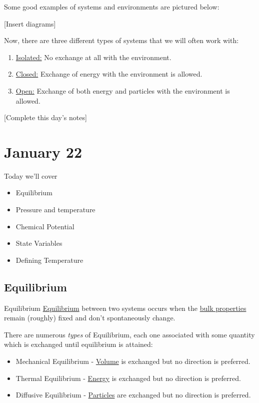 \documentclass{article}
\begin{document}
\vskip 0.5cm
Some good examples of systems and environments are pictured below: 

[Insert diagrams]

\vskip 0.5cm
Now, there are three different types of systems that we will often work with:
\begin{enumerate}
  \item \underline{Isolated:} No exchange at all with the environment.
  \item \underline{Closed:} Exchange of energy with the environment is allowed.
  \item \underline{Open:} Exchange of both energy and particles with the environment is allowed.
\end{enumerate}

[Complete this day's notes]

\pagebreak

\section{January 22}
Today we'll cover  
\begin{itemize}
  \item Equilibrium
  \item Pressure and temperature
  \item Chemical Potential
  \item State Variables
  \item Defining Temperature
\end{itemize}

\vskip 1cm
\subsection{Equilibrium}

\begin{mathdefinitionbox}{Equilibrium}
  \vskip 0.5cm
  \underline{Equilibrium} between two systems occurs when the \underline{bulk properties} remain (roughly) fixed and don't spontaneously change.
\end{mathdefinitionbox}

\vskip 0.25cm
There are numerous \emph{types} of Equilibrium, each one associated with some quantity which is exchanged until equilibrium is attained:
\begin{itemize}
  \item Mechanical Equilibrium - \underline{Volume} is exchanged but no direction is preferred.
  \item Thermal Equilibrium - \underline{Energy} is exchanged but no direction is preferred.
  \item Diffusive Equilibrium - \underline{Particles} are exchanged but no direction is preferred.
\end{itemize}
\end{document}
